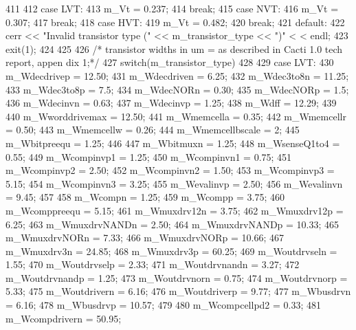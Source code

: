 \begin{DoxyCode}
{{411         {
412             case LVT:
413                 m_Vt = 0.237;
414                 break;
415             case NVT:
416                 m_Vt = 0.307;
417                 break;
418             case HVT:
419                 m_Vt = 0.482;
420                 break;
421             default:
422                 cerr << "Invalid transistor type (" << m_transistor_type << ")" <
      < endl;
423                 exit(1);
424         }
425 
426         /* transistor widths in um = as described in Cacti 1.0 tech report, appen
      dix 1;*/
427         switch(m_transistor_type)
428         {
429             case LVT:
430                 m_Wdecdrivep = 12.50;
431                 m_Wdecdriven = 6.25;
432                 m_Wdec3to8n = 11.25;
433                 m_Wdec3to8p = 7.5;
434                 m_WdecNORn = 0.30;
435                 m_WdecNORp = 1.5;
436                 m_Wdecinvn = 0.63;
437                 m_Wdecinvp = 1.25;
438                 m_Wdff = 12.29;
439 
440                 m_Wworddrivemax = 12.50;
441                 m_Wmemcella = 0.35;
442                 m_Wmemcellr = 0.50;
443                 m_Wmemcellw = 0.26;
444                 m_Wmemcellbscale = 2;
445                 m_Wbitpreequ = 1.25;
446 
447                 m_Wbitmuxn = 1.25;
448                 m_WsenseQ1to4 = 0.55;
449                 m_Wcompinvp1 = 1.25;
450                 m_Wcompinvn1 = 0.75;
451                 m_Wcompinvp2 = 2.50;
452                 m_Wcompinvn2 = 1.50;
453                 m_Wcompinvp3 = 5.15;
454                 m_Wcompinvn3 = 3.25;
455                 m_Wevalinvp = 2.50;
456                 m_Wevalinvn = 9.45;
457 
458                 m_Wcompn = 1.25;
459                 m_Wcompp = 3.75;
460                 m_Wcomppreequ = 5.15;
461                 m_Wmuxdrv12n = 3.75;
462                 m_Wmuxdrv12p = 6.25;
463                 m_WmuxdrvNANDn = 2.50;
464                 m_WmuxdrvNANDp = 10.33;
465                 m_WmuxdrvNORn = 7.33;
466                 m_WmuxdrvNORp = 10.66;
467                 m_Wmuxdrv3n = 24.85;
468                 m_Wmuxdrv3p = 60.25;
469                 m_Woutdrvseln = 1.55;
470                 m_Woutdrvselp = 2.33;
471                 m_Woutdrvnandn = 3.27;
472                 m_Woutdrvnandp = 1.25;
473                 m_Woutdrvnorn = 0.75;
474                 m_Woutdrvnorp = 5.33;
475                 m_Woutdrivern = 6.16;
476                 m_Woutdriverp = 9.77;
477                 m_Wbusdrvn = 6.16;
478                 m_Wbusdrvp = 10.57;
479 
480                 m_Wcompcellpd2 = 0.33;
481                 m_Wcompdrivern = 50.95;
}}}
\end{DoxyCode}
